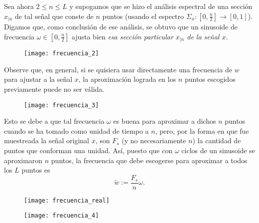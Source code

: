 Sea ahora $2 \leq n \leq L$ y
supogamos que
se hizo el análisis
espectral 
de una sección $x_{|n}$ de tal señal
que conste de $n$ puntos
(usando el espectro
$\Sigma_{x}: [0, \frac{n}{2}]
\longrightarrow [0,1]$).
Digamos que, como conclusión de ese análisis, se
obtuvo que un sinusoide de frecuencia $\omega \in [0, \frac{n}{2}]$
ajusta bien \textit{esa sección particular 
$x_{|n}$
de la señal $x$}.
\begin{figure}[H]
	\centering
	\texttt{[image: frecuencia\_2]} 
\end{figure}	

Observe que, en general, si se quisiera usar
directamente una frecuencia de $w$ para ajustar
a la señal $x$, la aproximación lograda en los
$n$ puntos escogidos previamente puede no ser válida.
\begin{figure}[H]
	\centering
	\texttt{[image: frecuencia\_3]} 
\end{figure}
Esto se debe a que	
tal frecuencia $\omega$ es buena para aproximar
a dichos $n$ puntos cuando se ha tomado como
unidad de tiempo a $n$, pero, 
por la forma en que fue muestreada la señal original $x$,
son $F_{s}$ (y no necesariamente $n$) la cantidad de puntos
que conforman una unidad. Así, puesto que con $\omega$
ciclos de un sinusoide se aproximaron $n$ puntos, 
la frecuencia que debe escogerse para aproximar a todos los $L$
puntos es
\begin{equation}
\label{eq: rel frecuencia real y ficticia}
\tilde{w} := \frac{F_{s}}{n} \omega.
\end{equation}

\begin{figure}[H]
	\centering
	\texttt{[image: frecuencia\_real]} 
\end{figure}	
\begin{figure}[H]
	\centering
	\texttt{[image: frecuencia\_4]} 
\end{figure}